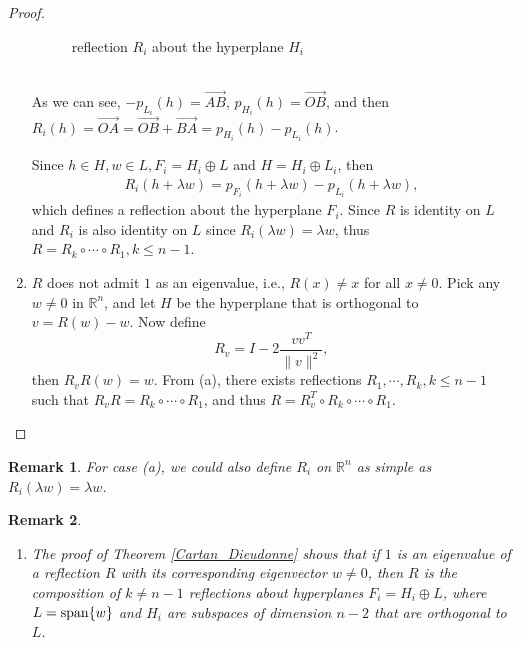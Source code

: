 \documentclass[10pt]{book}
\newtheorem{remark}{Remark}[chapter]
\theoremstyle{definition}
\numberwithin{equation}{chapter}
\begin{document}
\begin{subappendices}
\begin{proof}
\begin{enumerate}[label=(\alph*)]
    \begin{figure}[h]
        \centering
        \caption{reflection $R_i$ about the hyperplane $H_i$}
        \label{fig:plot_2}
    \end{figure}\\
    As we can see, $- p_{L_i}(h) = \overrightarrow{AB}$, $p_{H_i}(h) = \overrightarrow{OB}$, and then $R_i(h) = \overrightarrow{OA} = \overrightarrow{OB} + \overrightarrow{BA} = p_{H_i}(h) - p_{L_i}(h)$.
    
    Since $h \in H, w \in L, F_i = H_i \oplus L$ and $H = H_i \oplus L_i$, then
    \begin{align*}
        R_i(h + \lambda w) = p_{F_i}(h + \lambda w) - p_{L_i}(h + \lambda w), 
    \end{align*}
    which defines a reflection about the hyperplane $F_i$. Since $R$ is identity on $L$ and $R_i$ is also identity on $L$ since $R_i(\lambda w) = \lambda w$, thus $R = R_k \circ \cdots \circ R_1, k \leq n - 1$.
    
    \item $R$ does not admit $1$ as an eigenvalue, i.e., $R(x) \neq x$ for all $x \neq 0$. Pick any $w \neq 0$ in $\mathbb{R}^n$, and let $H$ be the hyperplane that is orthogonal to $v = R(w) - w$. Now define 
    $$R_v = I - 2 \frac{vv^T}{\|v\|^2},$$ 
    then $R_v R (w) = w$. From (a), there exists reflections $R_1, \cdots, R_k, k \leq n - 1$ such that $R_v R = R_k \circ \cdots \circ R_1$, and thus $R = R_v^T \circ R_k \circ \cdots \circ R_1$. 
\end{enumerate}
\end{proof}


\begin{remark}
For case (a), we could also define $R_i$ on $\mathbb{R}^n$ as simple as $R_i(\lambda w) = \lambda w$.
\end{remark}

\begin{remark}
~\begin{enumerate}[label=(\alph*)]
    \item The proof of Theorem \ref{Cartan_Dieudonne} shows that if $1$ is an eigenvalue of a reflection $R$ with its corresponding eigenvector $w \neq 0$, then $R$ is the composition of $k \neq n - 1$ reflections about hyperplanes $F_i = H_i \oplus L$, where $L = {\rm span}\{w\}$ and $H_i$ are subspaces of dimension $n - 2$ that are orthogonal to $L$. 
    

\end{enumerate}
\end{remark}
\end{subappendices}
\end{document}
